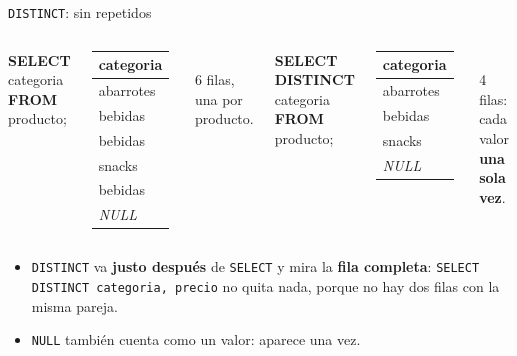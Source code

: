 \documentclass[aspectratio=169,10pt,c]{beamer}
\newcommand{\kw}[1]{\textcolor{utpRojo}{\textbf{#1}}}
\newcommand{\nuevo}[1]{{%
  \setlength{\fboxsep}{1.2pt}%
  \begingroup
  \renewcommand{\kw}[1]{\textcolor{utpNegro}{\textbf{##1}}}%
  \colorbox{yellow!45}{\textcolor{utpNegro}{#1}}%
  \endgroup}}
\newcommand{\mal}[1]{{\setlength{\fboxsep}{1.2pt}\colorbox{utpRojo!18}{#1}}}
\newcommand{\nulo}{\textcolor{utpGrisMedio}{\textit{NULL}}}
\newenvironment{sqlcode}[1][.86\textwidth]
  {\begin{center}\begin{lrbox}{\sqlbuf}\begin{minipage}{#1}\ttfamily\footnotesize\vspace{6pt}\raggedright}
  {\vspace{6pt}\end{minipage}\end{lrbox}\colorbox{utpGrisClaro}{\usebox{\sqlbuf}}\end{center}}
\begin{document}
\begin{frame}{\texttt{DISTINCT}: sin repetidos}
\begin{columns}[T,onlytextwidth]
\begin{sqlcode}[\textwidth]
\kw{SELECT} categoria \kw{FROM} producto;
\end{sqlcode}
\vspace{-0.2cm}
\centering\scriptsize\ttfamily
\begin{tabular}{l}
\toprule
\normalfont\bfseries categoria \\
\midrule
abarrotes \\
\mal{bebidas} \\
\mal{bebidas} \\
snacks \\
\mal{bebidas} \\
\nulo \\
\bottomrule
\end{tabular}\\[4pt]
\normalfont\small 6 filas, una por producto.
\begin{sqlcode}[\textwidth]
\kw{SELECT} \nuevo{\kw{DISTINCT}} categoria \kw{FROM} producto;
\end{sqlcode}
\vspace{-0.2cm}
\centering\scriptsize\ttfamily
\begin{tabular}{l}
\toprule
\normalfont\bfseries categoria \\
\midrule
abarrotes \\
bebidas \\
snacks \\
\nulo \\
\bottomrule
\end{tabular}\\[4pt]
\normalfont\small 4 filas: cada valor \textbf{una sola vez}.
\end{columns}
\vspace{0.3cm}
\small
\begin{itemize}\setlength\itemsep{4pt}
  \item \texttt{DISTINCT} va \textbf{justo después} de \texttt{SELECT} y mira la \textbf{fila completa}: \texttt{SELECT DISTINCT categoria, precio} no quita nada, porque no hay dos filas con la misma pareja.
  \item \texttt{NULL} también cuenta como un valor: aparece una vez.
\end{itemize}
\end{frame}
\end{document}

